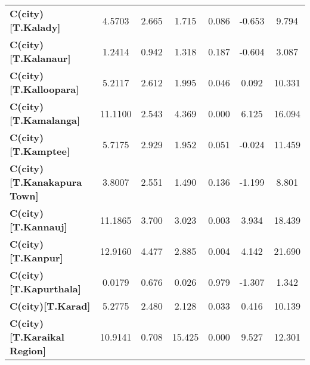 \begin{center}
\begin{tabular}{lcccccc}
\textbf{C(city)[T.Kalady]}                                                                          &       4.5703  &        2.665     &     1.715  &         0.086        &       -0.653    &        9.794     \\
\textbf{C(city)[T.Kalanaur]}                                                                        &       1.2414  &        0.942     &     1.318  &         0.187        &       -0.604    &        3.087     \\
\textbf{C(city)[T.Kalloopara]}                                                                      &       5.2117  &        2.612     &     1.995  &         0.046        &        0.092    &       10.331     \\
\textbf{C(city)[T.Kamalanga]}                                                                       &      11.1100  &        2.543     &     4.369  &         0.000        &        6.125    &       16.094     \\
\textbf{C(city)[T.Kamptee]}                                                                         &       5.7175  &        2.929     &     1.952  &         0.051        &       -0.024    &       11.459     \\
\textbf{C(city)[T.Kanakapura Town]}                                                                 &       3.8007  &        2.551     &     1.490  &         0.136        &       -1.199    &        8.801     \\
\textbf{C(city)[T.Kannauj]}                                                                         &      11.1865  &        3.700     &     3.023  &         0.003        &        3.934    &       18.439     \\
\textbf{C(city)[T.Kanpur]}                                                                          &      12.9160  &        4.477     &     2.885  &         0.004        &        4.142    &       21.690     \\
\textbf{C(city)[T.Kapurthala]}                                                                      &       0.0179  &        0.676     &     0.026  &         0.979        &       -1.307    &        1.342     \\
\textbf{C(city)[T.Karad]}                                                                           &       5.2775  &        2.480     &     2.128  &         0.033        &        0.416    &       10.139     \\
\textbf{C(city)[T.Karaikal Region]}                                                                 &      10.9141  &        0.708     &    15.425  &         0.000        &        9.527    &       12.301     \\

\end{tabular}
\end{center}
